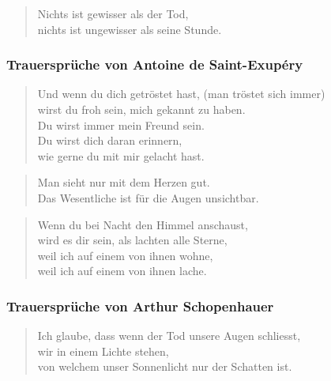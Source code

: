 \documentclass[ngerman,a4paper,11pt]{scrreprt}
\begin{document}
\begin{verse}
Nichts ist gewisser als der Tod, \\
nichts ist ungewisser als seine Stunde. \\
\end{verse}

\subsubsection*{Trauersprüche von Antoine de Saint-Exupéry}
\label{sec-2-1-2-3-4}

\begin{verse}
Und wenn du dich getröstet hast, (man tröstet sich immer) \\
wirst du froh sein, mich gekannt zu haben. \\
Du wirst immer mein Freund sein. \\
Du wirst dich daran erinnern, \\
wie gerne du mit mir gelacht hast. \\
\end{verse}

\begin{verse}
Man sieht nur mit dem Herzen gut. \\
Das Wesentliche ist für die Augen unsichtbar. \\
\end{verse}

\begin{verse}
Wenn du bei Nacht den Himmel anschaust, \\
wird es dir sein, als lachten alle Sterne, \\
weil ich auf einem von ihnen wohne, \\
weil ich auf einem von ihnen lache. \\
\end{verse}

\subsubsection*{Trauersprüche von Arthur Schopenhauer}
\label{sec-2-1-2-3-5}

\begin{verse}
Ich glaube, dass wenn der Tod unsere Augen schliesst, \\
wir in einem Lichte stehen, \\
von welchem unser Sonnenlicht nur der Schatten ist. \\
\end{verse}
\end{document}
